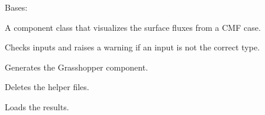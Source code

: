 \documentclass[letterpaper,10pt,english]{sphinxmanual}
\begin{document}
\begin{fulllineitems}
\label{\detokenize{cmf:livestock.components.comp_cmf.CMFSurfaceFluxResult}}
Bases: {\hyperref[\detokenize{superclass:livestock.components.component.GHComponent}]{}}

A component class that visualizes the surface fluxes from a CMF case.

\begin{fulllineitems}
\label{\detokenize{cmf:livestock.components.comp_cmf.CMFSurfaceFluxResult.check_inputs}}
Checks inputs and raises a warning if an input is not the correct type.

\end{fulllineitems}


\begin{fulllineitems}
\label{\detokenize{cmf:livestock.components.comp_cmf.CMFSurfaceFluxResult.config}}
Generates the Grasshopper component.

\end{fulllineitems}


\begin{fulllineitems}
\label{\detokenize{cmf:livestock.components.comp_cmf.CMFSurfaceFluxResult.delete_files}}
Deletes the helper files.

\end{fulllineitems}


\begin{fulllineitems}
\label{\detokenize{cmf:livestock.components.comp_cmf.CMFSurfaceFluxResult.load_result}}
Loads the results.

\end{fulllineitems}


\end{fulllineitems}
\end{document}

